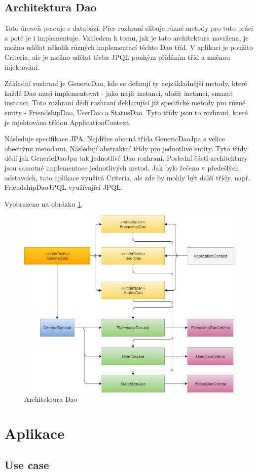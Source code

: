 \documentclass[
12pt,
a4paper,
pdftex,
czech,
titlepage
]{report}
\begin{document}
\section{Architektura Dao}
Tato úroveň pracuje s databází. Přes rozhraní slibuje různé metody pro tuto práci a poté je i implementuje. Vzhledem k tomu, jak je tato architektura navržena, je možno udělat několik různých implementací těchto Dao tříd. V aplikaci je použito Criteria, ale je možno udělat třeba JPQL pouhým přidáním tříd a změnou injektování. 

Základní rozhraní je GenericDao, kde se definují ty nejzákladnější metody, které každé Dao musí implementovat - jako najít instanci, uložit instanci, smazat instanci. Toto rozhraní dědí rozhraní deklarující již specifické metody pro různé entity - FriendshipDao, UserDao a StatusDao. Tyto třídy jsou to rozhraní, které je injektováno třídou ApplicationContext.

Následuje specifikace JPA. Nejdříve obecná třída GenericDaoJpa s velice obecnými metodami. Následují abstraktní třídy pro jednotlivé entity. Tyto třídy dědí jak GenericDaoJpa tak jednotlivé Dao rozhraní. Poslední částí architektury jsou samotné implementace jednotlivých metod. Jak bylo řečeno v předešlých odstavcích, tato aplikace využívá Criteria, ale zde by mohly být další třídy, např. FriendshipDaoJPQL využívající JPQL. 

Vyobrazeno na obrázku \ref{dao}.

\begin{figure}[H]
\caption{Architektura Dao}
\label{dao}
\includegraphics[width=\textwidth]{dao.png}
\end{figure}

\chapter{Aplikace}

\section{Use case}
\end{document}
